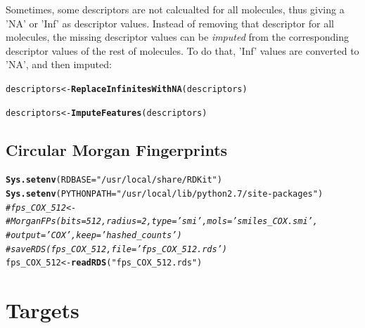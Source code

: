 \documentclass[twoside,a4wide,12pt]{article}\usepackage[]{graphicx}\usepackage[]{color}
\makeatletter
\newcommand{\hlstr}[1]{\textcolor[rgb]{0.192,0.494,0.8}{#1}}%
\newcommand{\hlcom}[1]{\textcolor[rgb]{0.678,0.584,0.686}{\textit{#1}}}%
\newcommand{\hlstd}[1]{\textcolor[rgb]{0.345,0.345,0.345}{#1}}%
\newcommand{\hlkwb}[1]{\textcolor[rgb]{0.69,0.353,0.396}{#1}}%
\newcommand{\hlkwc}[1]{\textcolor[rgb]{0.333,0.667,0.333}{#1}}%
\newcommand{\hlkwd}[1]{\textcolor[rgb]{0.737,0.353,0.396}{\textbf{#1}}}%
\newenvironment{kframe}{%
 \def\at@end@of@kframe{}%
 \ifinner\ifhmode%
  \def\at@end@of@kframe{\end{minipage}}%
  \begin{minipage}{\columnwidth}%
 \fi\fi%
 \def\FrameCommand##1{\hskip\@totalleftmargin \hskip-\fboxsep
 \colorbox{shadecolor}{##1}\hskip-\fboxsep
     \hskip-\linewidth \hskip-\@totalleftmargin \hskip\columnwidth}%
 \MakeFramed {\advance\hsize-\width
   \@totalleftmargin\z@ \linewidth\hsize
   \@setminipage}}%
 {\par\unskip\endMakeFramed%
 \at@end@of@kframe}
\newenvironment{knitrout}{}{} %
\makeatother
\begin{document}
Sometimes, some descriptors are not calcualted for all molecules, thus giving a 'NA' or 'Inf' as descriptor values. Instead of removing that descriptor for all molecules, the missing descriptor values can be {\it imputed} from the corresponding descriptor values of the rest of molecules. To do that, 'Inf' values are converted to 'NA', and then imputed:

\begin{knitrout}
\color{fgcolor}\begin{kframe}
\begin{alltt}
\hlstd{descriptors} \hlkwb{<-} \hlkwd{ReplaceInfinitesWithNA}\hlstd{(descriptors)}
\end{alltt}


{\ttfamily\noindent\bfseries\color{errorcolor}{\#\# Error: object 'descriptors' not found}}\begin{alltt}
\hlstd{descriptors} \hlkwb{<-} \hlkwd{ImputeFeatures}\hlstd{(descriptors)}
\end{alltt}


{\ttfamily\noindent\bfseries\color{errorcolor}{\#\# Error: object 'descriptors' not found}}\end{kframe}
\end{knitrout}


\subsection{Circular Morgan Fingerprints}
\begin{knitrout}
\color{fgcolor}\begin{kframe}
\begin{alltt}
\hlkwd{Sys.setenv}\hlstd{(}\hlkwc{RDBASE} \hlstd{=} \hlstr{"/usr/local/share/RDKit"}\hlstd{)}
\hlkwd{Sys.setenv}\hlstd{(}\hlkwc{PYTHONPATH} \hlstd{=} \hlstr{"/usr/local/lib/python2.7/site-packages"}\hlstd{)}
\hlcom{# fps_COX_512 <-}
\hlcom{# MorganFPs(bits=512,radius=2,type='smi',mols='smiles_COX.smi',}
\hlcom{# output='COX',keep='hashed_counts')}
\hlcom{# saveRDS(fps_COX_512,file='fps_COX_512.rds')}
\hlstd{fps_COX_512} \hlkwb{<-} \hlkwd{readRDS}\hlstd{(}\hlstr{"fps_COX_512.rds"}\hlstd{)}
\end{alltt}
\end{kframe}
\end{knitrout}


\section{Targets}
\end{document}
